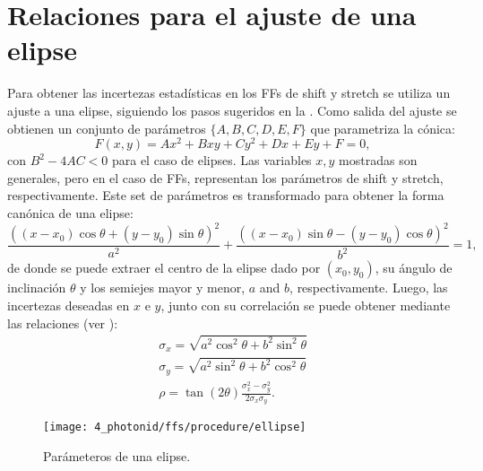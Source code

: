 \chapter{Relaciones para el ajuste de una elipse}
\label{app:ellipse_formulae}

Para obtener las incertezas estad\'isticas en los \acp{FF} de shift y stretch se utiliza un ajuste a una elipse, siguiendo los pasos sugeridos en la . Como salida del ajuste se obtienen un conjunto de par\'ametros \(\{A,B,C,D,E,F\}\) que parametriza la c\'onica:
\begin{equation*}
    F(x,y) = Ax^2 + Bxy + Cy^2 + Dx + Ey + F = 0,
\end{equation*}
con \(B^2 - 4AC < 0\) para el caso de elipses.
Las variables \(x,y\) mostradas son generales, pero en el caso de \acp{FF}, representan los par\'ametros de shift y stretch, respectivamente. Este set de par\'ametros es transformado para obtener la forma can\'onica de una elipse:
\begin{equation*}
    \frac{((x-x_0)\cos\theta + (y-y_0)\sin\theta)^2}{a^2} + \frac{((x-x_0)\sin\theta - (y-y_0)\cos\theta)^2}{b^2} = 1,
\end{equation*}
de donde se puede extraer el centro de la elipse dado por \((x_0, y_0)\), su \'angulo de inclinaci\'on \(\theta\) y los semiejes mayor y menor, \(a\) and \(b\), respectivamente. Luego, las incertezas deseadas en \(x\) e \(y\), junto con su correlaci\'on se puede obtener mediante las relaciones (ver \Fig{\ref{fig:ellipse_formulae:ellipse}}):
\begin{gather}
    \sigma_x = \sqrt{a^2 \cos^2\theta + b^2 \sin^2\theta}\\
    \sigma_y = \sqrt{a^2 \sin^2\theta + b^2 \cos^2\theta}\\
    \rho = \tan(2\theta) \frac{\sigma_{x}^2-\sigma_{y}^2}{2\sigma_{x}\sigma_{y}}.
\end{gather}

\begin{figure}[ht!]
    \centering
    \texttt{[image: 4\_photonid/ffs/procedure/ellipse]}
    \caption{Par\'ameteros de una elipse.}
    \label{fig:ellipse_formulae:ellipse}
\end{figure}
